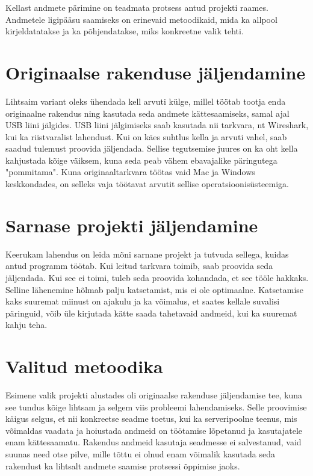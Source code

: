 Kellast andmete pärimine on teadmata protsess antud projekti raames.
Andmetele ligipääsu saamiseks on erinevaid metoodikaid, mida ka allpool kirjeldatatakse ja ka põhjendatakse, miks konkreetne valik tehti.

\section{Originaalse rakenduse jäljendamine}
Lihtsaim variant oleks ühendada kell arvuti külge, millel töötab tootja enda originaalne rakendus ning kasutada seda andmete kättesaamiseks, samal ajal USB liini jälgides.
USB liini jälgimiseks saab kasutada nii tarkvara, nt Wireshark, kui ka riistvaralist lahendust.
Kui on käes suhtlus kella ja arvuti vahel, saab saadud tulemust proovida jäljendada.
Sellise tegutsemise juures on ka oht kella kahjustada kõige väiksem, kuna seda peab vähem ebavajalike päringutega "pommitama".
Kuna originaaltarkvara töötas vaid Mac ja Windows keskkondades, on selleks vaja töötavat arvutit sellise operatsioonisüsteemiga.

\section{Sarnase projekti jäljendamine}
Keerukam lahendus on leida mõni sarnane projekt ja tutvuda sellega, kuidas antud programm töötab.
Kui leitud tarkvara toimib, saab proovida seda jäljendada.
Kui see ei toimi, tuleb seda proovida kohandada, et see tööle hakkaks.
Selline lähenemine hõlmab palju katsetamist, mis ei ole optimaalne.
Katsetamise kaks suuremat miinust on ajakulu ja ka võimalus, et saates kellale suvalisi päringuid, võib üle kirjutada kätte saada tahetavaid andmeid, kui ka suuremat kahju teha.

\section{Valitud metoodika}
Esimene valik projekti alustades oli originaalse rakenduse jäljendamise tee, kuna see tundus kõige lihtsam ja selgem viis probleemi lahendamiseks.
Selle proovimise käigus selgus, et nii konkreetse seadme toetus, kui ka serveripoolne teenus, mis võimaldas vaadata ja hoiustada andmeid on töötamise lõpetanud ja kasutajatele enam kättesaamatu.
Rakendus andmeid kasutaja seadmesse ei salvestanud, vaid suunas need otse pilve, mille tõttu ei olnud enam võimalik kasutada seda rakendust ka lihtsalt andmete saamise protsessi õppimise jaoks.


